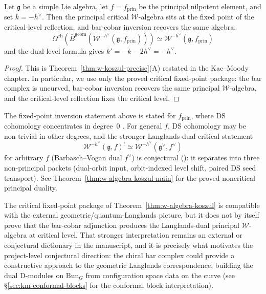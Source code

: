 \begin{theorem}\label{thm:w-algebra-koszul}
Let $\mathfrak{g}$ be a simple Lie algebra, let $f = f_{\mathrm{prin}}$
be the principal nilpotent element, and set $k=-h^\vee$. Then the
principal critical $\mathcal{W}$-algebra sits at the fixed point of the
critical-level reflection, and bar-cobar inversion recovers the same
algebra:
\begin{equation}
\Omega^{\mathrm{ch}}(\bar{B}^{\mathrm{geom}}(\mathcal{W}^{-h^\vee}(\mathfrak{g}, f_{\mathrm{prin}})))
\simeq \mathcal{W}^{-h^\vee}(\mathfrak{g}, f_{\mathrm{prin}})
\end{equation}
and the dual-level formula gives $k'=-k-2h^\vee=-h^\vee$.
\end{theorem}

\begin{proof}
This is Theorem~\ref{thm:w-koszul-precise}\textup{(A)} restated in the
Kac--Moody chapter. In particular, we use only the proved critical
fixed-point package: the bar complex is uncurved, bar-cobar inversion
recovers the same principal $\mathcal{W}$-algebra, and the
critical-level reflection fixes the critical level. \qedhere
\end{proof}

\begin{remark}
\label{rem:w-koszul-general-nilpotent}
The fixed-point inversion statement above is stated for
$f_{\mathrm{prin}}$, where DS cohomology concentrates in degree~$0$
\cite{FF}. For general $f$, DS cohomology may be non-trivial in other
degrees, and the stronger Langlands-dual critical statement
\[
\mathcal{W}^{-h^\vee}(\mathfrak{g}, f)^! \simeq \mathcal{W}^{-h^\vee}(\mathfrak{g}^\vee, f^\vee)
\]
for arbitrary $f$ (Barbasch--Vogan dual $f^\vee$) is conjectural
(\ClaimStatusConjectured): it separates into three non-principal packets
(dual-orbit input, orbit-indexed level shift, paired DS seed
transport). See Theorem~\ref{thm:w-algebra-koszul-main} for the proved
noncritical principal duality.
\end{remark}

\begin{remark}
The critical fixed-point package of
Theorem~\ref{thm:w-algebra-koszul} is compatible with the external
geometric/quantum-Langlands picture, but it does not by itself prove
that the bar-cobar adjunction produces the Langlands-dual principal
$\mathcal{W}$-algebra at critical level. That stronger interpretation
remains an external or conjectural dictionary in the manuscript, and it
is precisely what motivates the project-level conjectural direction:
the chiral bar complex could provide a constructive approach to the
geometric Langlands correspondence, building the dual D-modules on
$\mathrm{Bun}_G$ from configuration space data on the curve (see
\S\ref{sec:km-conformal-blocks} for the conformal block interpretation).
\end{remark}

